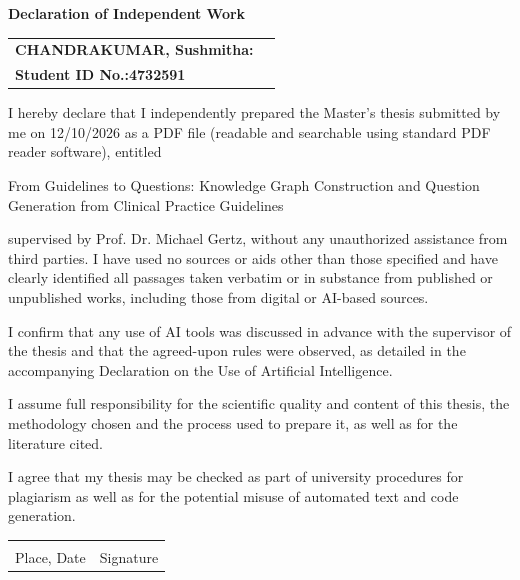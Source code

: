 \documentclass[headsepline,footsepline,12pt]{scrreprt}
\begin{document}


\newpage
\thispagestyle{empty}


\vspace*{100pt}
\centerline{\large{\textbf{ Declaration of Independent Work}}}

\bigskip

\noindent
    \begin{tabular}{lc}
        \textbf{CHANDRAKUMAR, Sushmitha:} &  \\
        \textbf{Student ID No.:4732591}  & 
    \end{tabular}

\medskip
I hereby declare that I independently prepared the Master's thesis submitted by me on 12/10/2026 as a PDF file (readable and searchable using standard PDF reader software), entitled

\medskip
From Guidelines to Questions: Knowledge Graph Construction and Question Generation from Clinical Practice Guidelines
\medskip

supervised by Prof. Dr. Michael Gertz, without any unauthorized assistance from third parties. I have used no sources or aids other than those specified and have clearly identified all passages taken verbatim or in substance from published or unpublished works, including those from digital or AI-based sources.

I confirm that any use of AI tools was discussed in advance with the supervisor of the
thesis and that the agreed-upon rules were observed, as detailed in the accompanying
Declaration on the Use of Artificial Intelligence.

I assume full responsibility for the scientific quality and content of this thesis, the methodology chosen and the process used to prepare it, as well as for the literature cited.

I agree that my thesis may be checked as part of university procedures for plagiarism as well as for the potential misuse of automated text and code generation.

\bigskip \bigskip
\bigskip
    \begin{tabular}{cc}
        \underline{\phantom{mmmmmmmmmmmmmmmmmmmm}} \qquad \qquad& \underline{\phantom{mmmmmmmmmmmmmmmmmmmmmmm}}\\
        Place, Date  & Signature
    \end{tabular}
\end{document}
